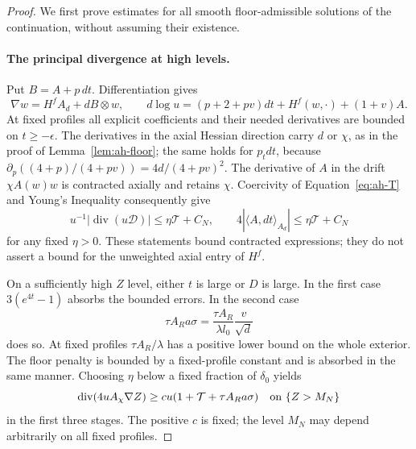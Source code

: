 \begin{proof}
We first prove estimates for all smooth floor-admissible solutions
of the continuation, without assuming their existence.

\paragraph{The principal divergence at high levels.}
Put \(B=A+p\,dt\). Differentiation gives
\[
 \nabla w=H^fA_d+dB\otimes w,\qquad
 d\log u=(p+2+pv)dt+H^f(w,\cdot)+(1+v)A .
\]
At fixed profiles all explicit coefficients and their needed
derivatives are bounded on \(t\ge-\epsilon\).
The derivatives in the axial Hessian direction carry \(d\) or \(\chi\),
as in the proof of Lemma~\ref{lem:ah-floor}; the same holds for
\(p_tdt\), because
\(\partial_p((4+p)/(4+pv))=4d/(4+pv)^2\).
The derivative of \(A\) in the drift \(\chi A(w)w\) is contracted
axially and retains \(\chi\). Coercivity of
Equation~\eqref{eq:ah-T} and Young's Inequality consequently give
\[
 u^{-1}|\operatorname{div}(u\mathcal D)|
 \le\eta\mathcal T+C_N,\qquad
 4|\langle A,dt\rangle_{A_d}|
 \le\eta\mathcal T+C_N
\]
for any fixed \(\eta>0\). These statements bound contracted
expressions; they do not assert a bound for the unweighted axial
entry of \(H^f\).

On a sufficiently high \(Z\) level, either \(t\) is large or \(D\) is large.
In the first case \(3(e^{4t}-1)\) absorbs the bounded errors.
In the second case
\[
 \tau A_Ra\sigma
 =\frac{\tau A_R}{\lambda l_0}\frac{v}{\sqrt d}
\]
does so. At fixed profiles \(\tau A_R/\lambda\) has a positive
lower bound on the whole exterior. The floor penalty is bounded
by a fixed-profile constant and is absorbed in the same manner.
Choosing \(\eta\) below a fixed fraction of \(\delta_0\) yields
\begin{equation}\label{eq:ah-high-divergence}
 \operatorname{div}(4uA_\chi\nabla Z)
 \ge cu(1+\mathcal T+\tau A_Ra\sigma)
 \quad\hbox{on } \{Z>M_N\}
\end{equation}
in the first three stages. The positive \(c\) is fixed; the level
\(M_N\) may depend arbitrarily on all fixed profiles.


\end{proof}
